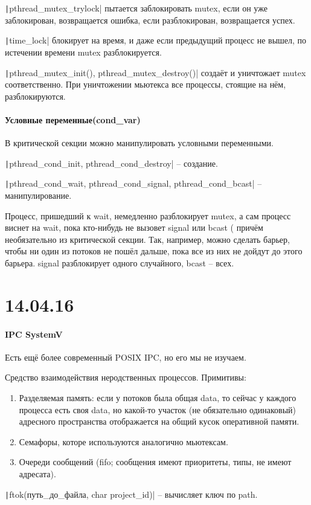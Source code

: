 \documentclass[a4paper,10pt]{article}
\newcommand{\ci}{\texttt}
\begin{document}
\ci|pthread_mutex_trylock| пытается заблокировать mutex, если он уже заблокирован, возвращается ошибка, если разблокирован, возвращается успех.

\ci|time_lock| блокирует на время, и даже если предыдущий процесс не вышел, по истечении времени mutex разблокируется.

\ci|pthread_mutex_init(), pthread_mutex_destroy()| создаёт и уничтожает mutex соответственно. При уничтожении мьютекса все процессы, стоящие на нём, разблокируются.

\paragraph{Условные переменные(cond\_var)}
В критической секции можно манипулировать условными переменными.

\ci|pthread_cond_init, pthread_cond_destroy| -- создание.

\ci|pthread_cond_wait, pthread_cond_signal, pthread_cond_bcast| -- манипулирование.

Процесс, пришедший к wait, немедленно разблокирует mutex, а сам процесс виснет на wait, пока кто-нибудь не вызовет signal или bcast ( причём необязательно из критической секции. Так, например, можно сделать барьер, чтобы ни один из потоков не пошёл дальше, пока все из них не дойдут до этого барьера.
signal разблокирует одного случайного, bcast -- всех.

\section{14.04.16}
\paragraph{IPC SystemV}
Есть ещё более современный POSIX IPC, но его мы не изучаем.

Средство взаимодействия неродственных процессов. 
Примитивы:
\begin{enumerate}
\item Разделяемая память: если у потоков была общая data, то сейчас у каждого процесса есть своя data, но какой-то участок (не обязательно одинаковый) адресного пространства отображается на общий кусок оперативной памяти.
\item Семафоры, которе используются аналогично мьютексам.
\item Очереди сообщений (fifo; сообщения имеют приоритеты, типы, не имеют адресата).
\end{enumerate}
\ci|ftok(путь_до_файла, char project_id)| -- вычисляет ключ по path.
\end{document}
